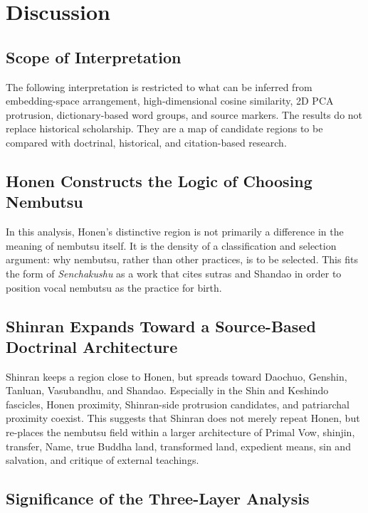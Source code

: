 \documentclass[uplatex,dvipdfmx,11pt,a4paper]{jsarticle}
\begin{document}
\section{Discussion}

\subsection{Scope of Interpretation}

The following interpretation is restricted to what can be inferred from embedding-space arrangement, high-dimensional cosine similarity, 2D PCA protrusion, dictionary-based word groups, and source markers. The results do not replace historical scholarship. They are a map of candidate regions to be compared with doctrinal, historical, and citation-based research.

\subsection{Honen Constructs the Logic of Choosing Nembutsu}

In this analysis, Honen's distinctive region is not primarily a difference in the meaning of nembutsu itself. It is the density of a classification and selection argument: why nembutsu, rather than other practices, is to be selected. This fits the form of \emph{Senchakushu} as a work that cites sutras and Shandao in order to position vocal nembutsu as the practice for birth.

\subsection{Shinran Expands Toward a Source-Based Doctrinal Architecture}

Shinran keeps a region close to Honen, but spreads toward Daochuo, Genshin, Tanluan, Vasubandhu, and Shandao. Especially in the Shin and Keshindo fascicles, Honen proximity, Shinran-side protrusion candidates, and patriarchal proximity coexist. This suggests that Shinran does not merely repeat Honen, but re-places the nembutsu field within a larger architecture of Primal Vow, shinjin, transfer, Name, true Buddha land, transformed land, expedient means, sin and salvation, and critique of external teachings.

\subsection{Significance of the Three-Layer Analysis}
\end{document}
